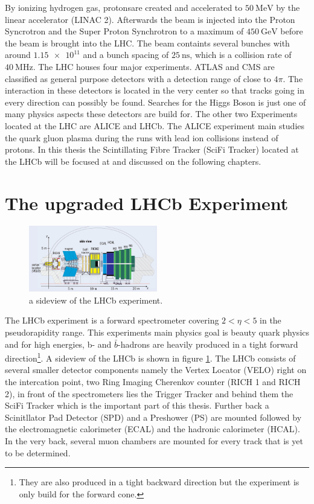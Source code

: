 By ionizing hydrogen gas, protonsare created and accelerated to $\SI{50}{\mega\electronvolt}$ by the linear accelerator (LINAC 2). Afterwards the beam is injected into the Proton Syncrotron and the Super Proton Synchrotron to a maximum of $\SI{450}{\giga\electronvolt}$ before the beam is brought into the LHC.
The beam containts several bunches with around $\num{1.15e11}$ and a bunch spacing of $\SI{25}{\nano\second}$, which is a collision rate of $\SI{40}{\mega\hertz}$.
The LHC houses four major experiments. ATLAS and CMS are classified as general purpose detectors with a detection range of close to $4\pi$. The interaction in these detectors is located in the very center so that tracks going in every direction can possibly be found. Searches for the Higgs Boson is just one of many physics aspects these detectors are build for.
The other two Experiments located at the LHC are ALICE and LHCb.
The ALICE experiment main studies the quark gluon plasma during the runs with lead ion collisions instead of protons.
In this thesis the Scintillating Fibre Tracker (SciFi Tracker) located at the LHCb will be focused at and discussed on the following chapters.

\section{The upgraded LHCb Experiment \cite{lhcbInfo}}

\begin{figure}
  \centering
  \includegraphics[width=0.5\textwidth]{plots/LHCb_facility.jpg}
  \caption{a sideview of the LHCb experiment.}
  \label{fig:LHCb}
\end{figure}

The LHCb experiment is a forward spectrometer covering $2 \less \eta \less 5$ in the pseudorapidity range. This experiments main physics goal is beauty quark physics and for high energies, b- and $\bar{b}$-hadrons are heavily produced in a tight forward direction\footnote{They are also produced in a tight backward direction but the experiment is only build for the forward cone.}. A sideview of the LHCb is shown in figure \ref{fig:LHCb}.
The LHCb consists of several smaller detector components namely the Vertex Locator (VELO) right on the intercation point, two Ring Imaging Cherenkov counter (RICH 1 and RICH 2), in front of the spectrometers lies the Trigger Tracker and behind them the SciFi Tracker which is the important part of this thesis. Further back a Scinitllator Pad Detector (SPD) and a Preshower (PS) are mounted followed by the electromagnetic calorimeter (ECAL) and the hadronic calorimeter (HCAL). In the very back, several muon chambers are mounted for every track that is yet to be determined.

